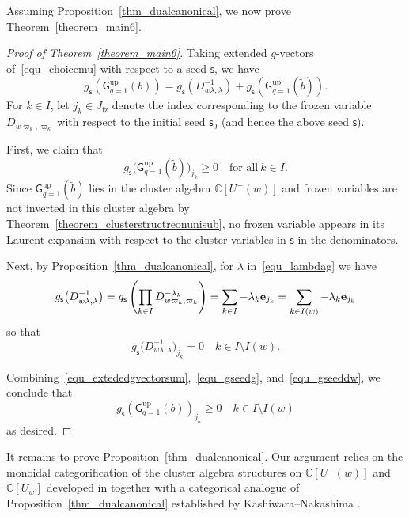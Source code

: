 \documentclass[11pt]{amsart}
\newcommand{\C}{\mathbb{C}}
\numberwithin{equation}{section}
\theoremstyle{plain}
\theoremstyle{definition}
\numberwithin{equation}{section}
\newcommand{\seed}{\mathsf{s}}
\begin{document}
Assuming Proposition~\ref{thm_dualcanonical}, we now prove Theorem~\ref{theorem_main6}.
\begin{proof}[Proof of Theorem~\ref{theorem_main6}]
Taking extended $g$-vectors of~\eqref{equ_choicemu} with respect to a seed $\seed$, we have
\begin{equation}\label{equ_extededgvectorsum}
g_{\seed}(\mathsf{G}^{\mathrm{up}}_{q=1}(b)) = g_{\seed} (D_{w \lambda, \lambda}^{-1}) + g_{\seed} (\mathsf{G}^{\mathrm{up}}_{q=1}(\widetilde{b})).
\end{equation}
For $k \in I$, let $j_k \in J_\mathrm{fz}$ denote the index corresponding to the frozen variable $D_{w \varpi_k, \varpi_k}$ with respect to the initial seed $\seed_0$ (and hence the above seed $\seed$).

First, we claim that
\begin{equation}\label{equ_gseedg}
g_{\seed} \bigl(\mathsf{G}^{\mathrm{up}}_{q=1}(\widetilde{b})\bigr)_{j_k} \geq 0 \quad \text{for all} \ k \in I.
\end{equation}
Since $\mathsf{G}^{\mathrm{up}}_{q=1}(\widetilde{b})$ lies in the cluster algebra $\C[U^-(w)]$ and frozen variables are not inverted in this cluster algebra by Theorem~\ref{theorem_clusterstructreonunisub}, no frozen variable appears in its Laurent expansion with respect to the cluster variables in $\seed$ in the denominators.

Next, by Proposition~\ref{thm_dualcanonical}, for $\lambda$ in~\eqref{equ_lambdag} we have
$$
g_{\seed} \bigl(D_{w \lambda, \lambda}^{-1} \bigr) =  g_{\seed} \left( \prod_{k\in I} D_{w \varpi_k, \varpi_k}^{-\lambda_k} \right) = \sum_{k\in I} -\lambda_k {\bold e}_{j_k} =\sum_{k\in  I(w)} -\lambda_k {\bold e}_{j_k} 
$$
so that 
\begin{equation}\label{equ_gseeddw}
g_{\seed} \bigl(D_{w \lambda, \lambda}^{-1} \bigr)_{j_k}=0 \quad \text{$k \in I \setminus I(w)$}.
\end{equation}

Combining~\eqref{equ_extededgvectorsum},~\eqref{equ_gseedg}, and~\eqref{equ_gseeddw}, we conclude that 
$$
g_{\seed}(\mathsf{G}^{\mathrm{up}}_{q=1}(b))_{j_k}\geq 0 \quad \text{$k \in I \setminus I(w)$}
$$
as desired.
\end{proof}

It remains to prove Proposition~\ref{thm_dualcanonical}. Our argument relies on the monoidal categorification of the cluster algebra structures on $\C[U^-(w)]$ and $\C[U^-_w]$ developed in \cite{KKKO18, KKOP21, KKOP23} together with a categorical analogue of Proposition~\ref{thm_dualcanonical} established by Kashiwara--Nakashima \cite{KN25}. 
\end{document}
